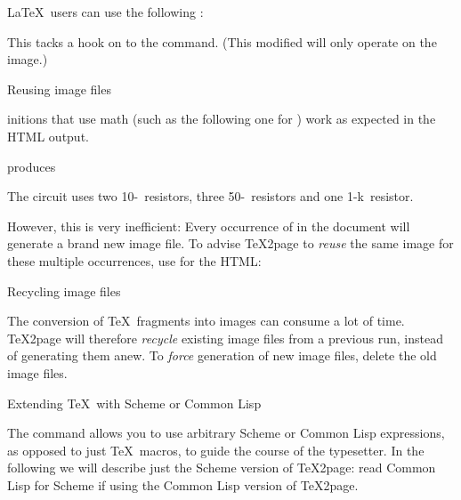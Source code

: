 {{{{{{{{{{{{{{\LaTeX\ users can use the following%
\iffalse, but there
must be a better way\fi:

\p{
\ifx\shipout\UnDeFiNeD
  \imgpreamble
    \let\LaTeXdocument\document
    \def\document{\LaTeXdocument\Large}
  \endimgpreamble
\fi
}

This tacks a hook on to the \p{\document} command.
(This modified \p{\document} will only operate
on the image.)

\beginsection Reusing image files

%
\p{\def}initions that use math (such as the following
one for \p{\ohm}) work as expected in the
HTML output.


\n produces

\quote

\n The circuit uses two 10-\ohm\ resistors, three 50-\ohm\
resistors and one 1-k\ohm\ resistor.

\endquote


\n However, this is very inefficient: Every occurrence
of \p{\ohm} in the document will generate a brand new
image file.  To advise \TeX2page to {\em reuse}
the same image for these multiple occurrences, use
\p{\imgdef} for the HTML:

\p{
\ifx\shipout\UnDeFiNeD %
  \imgdef\ohm{$\Omega$}
\else
  \def\ohm{$\Omega$}
\fi
}

\beginsection Recycling image files

%
The conversion of \TeX\ fragments into images can
consume a lot of time.  \TeX2page will therefore
{\em recycle} existing image files from
a previous run, instead of generating them anew.
To {\em force} generation of new image files, delete
the old image files.

 Extending \TeX\ with Scheme or Common Lisp

%
The command \p{\eval} allows you to use arbitrary
Scheme or Common Lisp expressions, as opposed to just \TeX\ macros, to
guide the course of the typesetter.  In the following we will describe
just
the Scheme version of \TeX2page: read Common Lisp for Scheme if
using the Common Lisp version of \TeX2page.

}}}}}}}}}}}}}}
